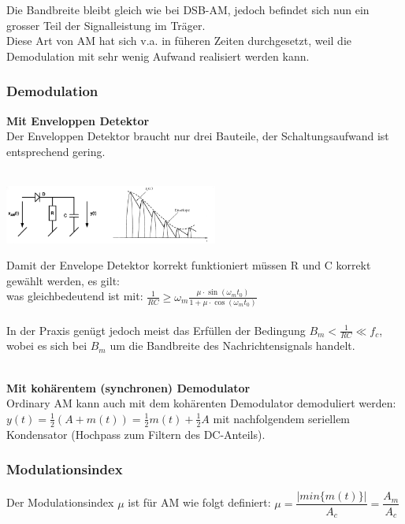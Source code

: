 Die Bandbreite bleibt gleich wie bei DSB-AM, jedoch befindet sich nun ein grosser Teil der
Signalleistung im Träger. \\
Diese Art von AM hat sich v.a. in füheren Zeiten durchgesetzt, weil die Demodulation mit sehr
wenig Aufwand realisiert werden kann. 

\subsubsection{Demodulation}
\textbf{Mit Enveloppen Detektor}  \\
Der Enveloppen Detektor braucht nur drei Bauteile, der Schaltungsaufwand ist entsprechend gering.\\ \\
\begin{minipage}{7cm}	
      \includegraphics[width=7cm]{bilder/am_oam_enveloppeDetektor.png}
\end{minipage}
\begin{minipage}{11cm}
Damit der Envelope Detektor korrekt funktioniert müssen R und C korrekt gewählt werden, es gilt: \\
  was gleichbedeutend ist mit: 
$\frac{1}{RC} \geq \omega_m \frac{\mu \cdot \sin(\omega_m t_0)}{1+\mu\cdot\cos(\omega_mt_0)}$ \\ \\
In der Praxis genügt jedoch meist das Erfüllen der Bedingung $B_m < \frac{1}{RC} \ll f_c$,
wobei es sich bei $B_m$ um die Bandbreite des Nachrichtensignals handelt. 
\end{minipage} \\

\textbf{Mit kohärentem (synchronen) Demodulator}\\
Ordinary AM kann auch mit dem kohärenten Demodulator demoduliert werden:
$y(t) = \frac12 (A + m(t)) = \frac12 m(t) + \frac12 A$ mit nachfolgendem
seriellem Kondensator (Hochpass zum Filtern des DC-Anteils).


\subsubsection{Modulationsindex }
Der Modulationsindex $\mu$ ist für AM wie folgt definiert: $ \boxed{\mu = \dfrac{|min\{m(t)\}|}{A_c} = \dfrac{A_m}{A_c}}$\\


